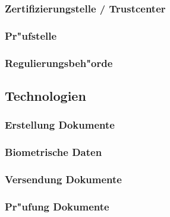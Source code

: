 \documentclass[a4paper, 12pt]{article}
\begin{document}


\subsubsection{Zertifizierungstelle / Trustcenter}
\label{sec:Zertifizierungstelle / Trustcenter}



\subsubsection{Pr"ufstelle}
\label{sec:Pr"ufstelle}



\subsubsection{Regulierungsbeh"orde}
\label{sec:Regulierungsbeh"orde}



\subsection{Technologien}
\label{sec:Technologien}



\subsubsection{Erstellung Dokumente}
\label{sec:Erstellung Dokumente}



\subsubsection{Biometrische Daten}
\label{sec:Biometrische Daten}



\subsubsection{Versendung Dokumente}
\label{sec:Versendung Dokumente}



\subsubsection{Pr"ufung Dokumente}
\label{sec:Pr"ufung Dokumente}
\end{document}
